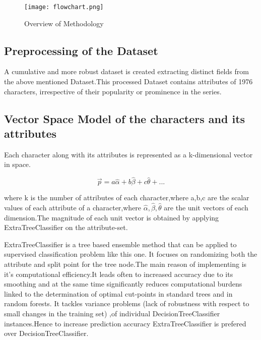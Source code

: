 \documentclass[conference]{IEEEtran}
\begin{document}
\begin{figure}
    \centering
    \texttt{[image: flowchart.png]}
    \caption{Overview of Methodology}
    \label{fig:1}
\end{figure}
\subsection{Preprocessing of the Dataset}
A cumulative and more robust dataset is created extracting distinct fields from the above mentioned Dataset.This processed Dataset contains attributes of 1976 characters, irrespective of their popularity or prominence in the series.


\subsection{Vector Space Model of the characters and its attributes}
Each character along with its attributes is represented as a k-dimensional vector in space.

\begin{equation}
    {\vec{p}} = a\hat{\alpha} + b\hat{\beta} + c\hat{\theta} + ...
\end{equation}

where k is the number of attributes of each character,where a,b,c are the scalar values of each attribute of a character,where $\hat{\alpha},\hat{\beta},\hat{\theta}$ are the unit vectors of each dimension.The magnitude of each unit vector is obtained by applying  ExtraTreeClassifier on the attribute-set.

ExtraTreeClassifier is a tree based ensemble method that can be applied to supervised classification problem like this one. It focuses on randomizing both the attribute and split point for the tree node.The main reason of implementing is it's computational efficiency.It leads often to increased accuracy due to its smoothing and at the same time significantly reduces computational burdens linked to the determination of optimal cut-points in standard trees and in random forests. 
It tackles variance problems (lack of robustness with respect to small changes in the training set) ,of individual DecisionTreeClassifier instances.Hence to increase prediction accuracy ExtraTreeClassifier is prefered over DecisionTreeClassifier. 

\end{document}
